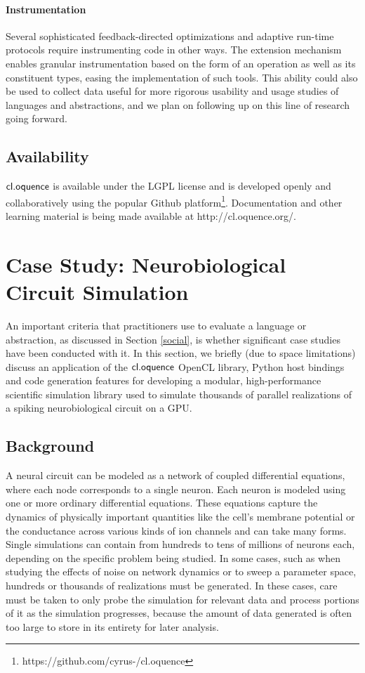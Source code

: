 \documentclass{llncs}
\begin{document}
\paragraph{Instrumentation}
Several sophisticated feedback-directed optimizations and adaptive run-time protocols require instrumenting code in other ways. The extension mechanism enables granular instrumentation based on the form of an operation as well as its constituent types, easing the implementation of such tools. This ability could also be used to collect data useful for more rigorous usability and usage studies of languages and abstractions, and we plan on following up on this line of research going forward.

\subsection{Availability}
$\textsf{cl.oquence}$ is available under the LGPL license and is developed openly and collaboratively using the popular Github platform\footnote{https://github.com/cyrus-/cl.oquence}. Documentation and other learning material is being made available at http://cl.oquence.org/.

\section{Case Study: Neurobiological Circuit Simulation}
An important criteria that practitioners use to evaluate a language or abstraction, as discussed in Section \ref{social}, is whether significant case studies have been conducted with it. In this section, we briefly (due to space limitations) discuss an application of the $\textsf{cl.oquence}$ OpenCL library, Python host bindings and code generation features for developing a modular, high-performance scientific simulation library used to simulate  thousands of parallel realizations of a spiking neurobiological circuit on a GPU.

\subsection{Background}
A neural circuit can be modeled as a network of coupled differential equations, where each node corresponds to a single neuron. Each neuron is modeled using one or more ordinary differential equations. These equations capture the dynamics of physically important quantities like the cell's membrane potential or the conductance across various kinds of ion channels and can take many forms. Single simulations can contain from hundreds to tens of millions of neurons each, depending on the specific problem being studied. In some cases, such as when studying the effects of noise on network dynamics or to sweep a parameter space, hundreds or thousands of realizations must be generated. In these cases, care must be taken to only probe the simulation for relevant data and process portions of it as the simulation progresses, because the amount of data generated is often too large to store in its entirety for later analysis.
\end{document}
